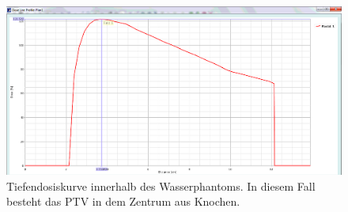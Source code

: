 \begin{figure}[H]
  \centering
  \includegraphics[width=\textwidth]{../../Wasserphantom Bilder/TDK_Knochen.png}
  \caption{Tiefendosiskurve innerhalb des Wasserphantoms. In diesem Fall besteht das PTV in dem Zentrum aus Knochen.}
  \label{TDK4}
\end{figure}
